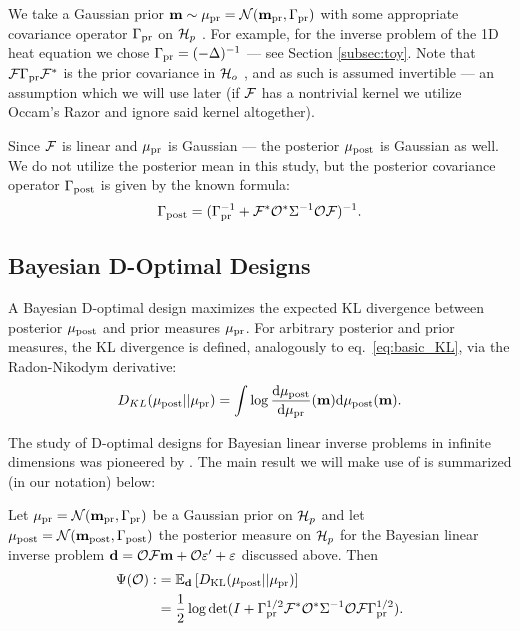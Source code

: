 We take a Gaussian prior \(\mathbf{m} \sim \mu_{\textup{pr}} = \mathcal{N}(\mathbf{m}_{\textup{pr}}
,\Gamma_{\textup{pr}})\) with some appropriate covariance operator \(\Gamma_{\textup{pr}}\) on
\(\mathcal{H}_p\) \cite{Stuart10}. For example, for the inverse problem of the
1D heat equation we chose $\Gamma_{\textup{pr}} = (-\Delta)^{-1}$ --- see Section
\ref{subsec:toy}. Note that \(\mathcal{F} \Gamma_{\textup{pr}} \mathcal{F}^*\) is the prior
covariance in \(\mathcal{H}_o\) \cite{Stuart10}, and as such is assumed
invertible --- an assumption which we will use later (if \(\mathcal{F}\) has
a nontrivial kernel we utilize Occam's Razor and ignore said kernel
altogether).

Since $\mathcal{F}$ is linear and $\mu_{\textup{pr}}$ is Gaussian --- the posterior
\(\mu_{\textup{post}}\) is Gaussian as well. We do not utilize the posterior mean in
this study, but the posterior covariance operator $\Gamma_{\textup{post}}$ is given
by the known formula\cite{Stuart10}:
\begin{align}\label{eq:postcov}
  \postcov = (\prcov^{-1} + \fwd^* \obs^* \Sigma^{-1} \obs \fwd
  )^{-1}.
\end{align}

\subsection{Bayesian D-Optimal Designs}\label{subsec:D_optimal_design} 
A Bayesian D-optimal design maximizes the expected KL divergence
between posterior \(\mu_{\textup{post}}\) and prior measures \(\mu_{\textup{pr}}\). For arbitrary
posterior and prior measures, the KL divergence is defined,
analogously to eq.~\ref{eq:basic_KL}, via the Radon-Nikodym
derivative:
\begin{equation*}
  D_{KL}(\post||\pr) = \int \log \frac{\der \post}{\der \pr}(\param) \der \post(\param).
\end{equation*}

The study of D-optimal designs for Bayesian linear inverse problems in
infinite dimensions was pioneered by \cite{AlexanderianGloorGhattas14,
  alexanderian2018efficient}. The main result we will make use of is
summarized (in our notation) below:

\begin{theorem}\label{thm:d_optimality}
  Let \(\mu_{\textup{pr}} = \mathcal{N}(\mathbf{m}_{\textup{pr}},\Gamma_{\textup{pr}})\) be a Gaussian prior on \(\mathcal{H}_p\)
  and let \(\mu_{\textup{post}} = \mathcal{N}(\mathbf{m}_{\textup{post}},\Gamma_{\textup{post}})\) the posterior measure
  on \(\mathcal{H}_p\) for the Bayesian linear inverse problem \(\mathbf{d} = \mathcal{O}
  \mathcal{F}\mathbf{m} + \mathcal{O} \varepsilon' + \varepsilon\) discussed above. Then
  \begin{align}\label{eq:objective}
    \begin{split}
      \tar( \obs) :&= \mathbb{E}_{\data}\left [ D_{\text{KL}} (\post || \pr ) \right ] \\
      &= \frac12 \log \det 
      ( I + \prcov^{1/2}  \fwd ^* \obs^* \Sigma^{-1} \obs \fwd \prcov^{1/2}).
    \end{split}
  \end{align}
\end{theorem}


